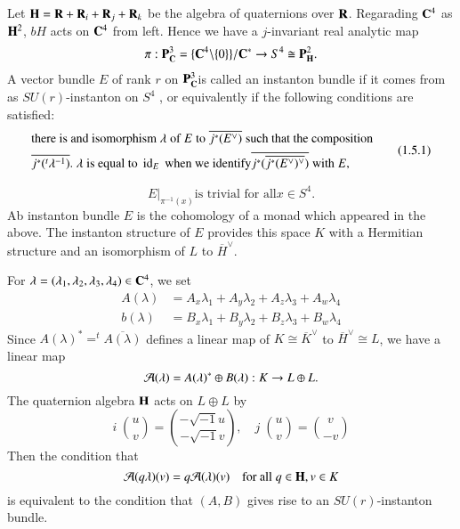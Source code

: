 Let $\mathbf{H} =\mathbf{R} +\mathbf{R}_{i} + \mathbf{R}_{j} + \mathbf{R}_{k}$ be the algebra of quaternions over $\mathbf{R}$. Regarading $\mathbf{C}^{4}$ as $\mathbf{H}^{2}$, $bH$ acts on $\mathbf{C}^{4}$ from left. Hence we have a $j$-invariant real analytic map
$$
\pi : \mathbf{P}^{3}_{\mathbf{C}} = \{\mathbf{C}^{4}\backslash \{0\}\}/{\mathbf{C}}^{*} \rightarrow S^{4} \cong \mathbf{P}_{\mathbf{H}}^{2}.
$$
A vector bundle $E$ of rank $r$ on $\mathbf{P}_{\mathbf{C}}^{3}$is called an instanton bundle if it comes from as $SU(r)$-instanton on $S^{4}$ , or equivalently if the following conditions are satisfied:
\begin{equation}
\begin{aligned}
&\text{there is and isomorphism} \;\lambda\; \text{of} \;E\; \text{to} \;\overline{j^{*}(E^{\vee})}\; \text{such that the composition}\\
&\overline{j^{*}(^{t}\lambda^{-1})}.\; \lambda \;\text{is equal to} \;\operatorname{id}_{E} \;\text{when we identify} \overline{j^{*}(\overline{j^{*}(E^{\vee})^{\vee}})}\; \text{with}\; E,
\end{aligned}\tag{1.5.1}\label{art12-eq-1.5.1} 
\end{equation}

\begin{equation}
E|_{\pi^{-1}(x)} \text{is trivial for all} x \in S^{4}.\tag{1.5.2}\label{art12-eq-1.5.2} 
\end{equation}
Ab instanton bundle $E$ is the cohomology of a monad which appeared in the above. The instanton structure of $E$ provides this space $K$ with a Hermitian structure and an isomorphism of $L$ to $\overline{H}^{\vee}$.

For  $\lambda =(\lambda_{1}, \lambda_{2}, \lambda_{3}, \lambda_{4}) \in \mathbf{C}^{4}$, we set
\begin{align*}
A(\lambda) &= A_{x}\lambda_{1} + A_{y}\lambda_{2} +A_{z}\lambda_{3} + A_{w}\lambda_{4}\\
b(\lambda) &= B_{x}\lambda_{1} + B_{y}\lambda_{2} +B_{z}\lambda_{3} + B_{w}\lambda_{4}
\end{align*}
Since $A(\lambda)^{*} = ^{t}\overline{A(\lambda)}$ defines a linear map of $K \cong\overline{K}^{\vee}$ to
$\overline{H}^{\vee} \cong L$, we have a linear map
$$
\mathcal{A}(\lambda) = A(\lambda)^{*} \oplus B(\lambda) : K \rightarrow L \oplus L.
$$
The quaternion algebra $\mathbf{H}$ acts on $L \oplus L$ by
$$
i \;\binom{u}{v} = \binom{-\sqrt{-1}u}{-\sqrt{-1}v}, \quad j\; \binom{u}{v}= \binom{v}{-v}
$$ 
Then the condition that
$$
\mathcal{A}(q\lambda)(v)=q \mathcal{A}(\lambda)(v)\quad \text{for all}\; q \in \mathbf{H}, v \in K
$$
is equivalent to the condition that $(A, B)$ gives rise to an $SU(r)$-instanton bundle.

